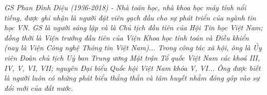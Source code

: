 \textit{GS Phan Đình Diệu (1936-2018) - Nhà toán học, nhà khoa học máy tính nổi tiếng, được ghi nhận là người đặt viên gạch đầu cho sự phát triển của ngành tin học VN. GS là người sáng lập và là Chủ tịch đầu tiên của Hội Tin học Việt Nam; đồng thời là Viện trưởng đầu tiên của Viện Khoa học tính toán và Điều khiển (nay là Viện Công nghệ Thông tin Việt Nam)... Trong công tác xã hội, ông là Ủy viên Đoàn chủ tịch Uỷ ban Trung ương Mặt trận Tổ quốc Việt Nam các khoá III, IV, V, VI, VII; nguyên Đại biểu Quốc hội Việt Nam khóa V, VI... Ông được biết là người luôn có những phát biểu thẳng thắn và tâm huyết nhằm đóng góp vào sự đổi mới của đất nước. }